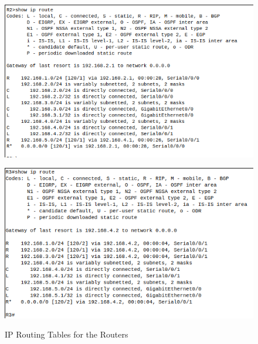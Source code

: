 \documentclass[../EngineeringJournal_CDavis.tex]{subfiles}
\begin{document}
\begin{figure}[!hbt]
  \begin{minipage}[c]{0.4\linewidth}
    \centering
      \includegraphics[scale=0.33]{Figures/2020-01-31-032658_561x345_scrot.png}
      \label{verify7R2}
  \end{minipage}\hfill
  \begin{minipage}[c]{0.4\linewidth}
    \centering
    \includegraphics[scale=0.33]{Figures/2020-01-31-032725_536x324_scrot.png}
    \label{verify7R3}
  \end{minipage}
  \caption{IP Routing Tables for the Routers}\label{verify7}
\end{figure}


\end{document}
